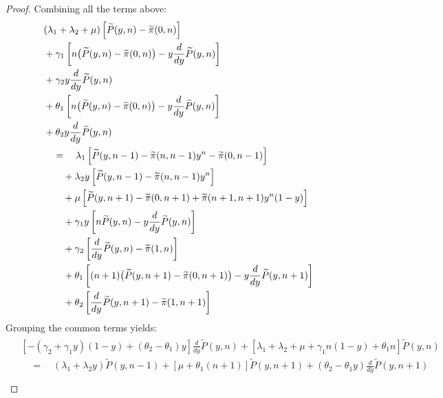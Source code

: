 \begin{proof}
    Combining all the terms above:
    \begin{align*}
        \begin{split}
            & (\lambda_1 + \lambda_2 + \mu) \left[ \widetilde{P}(y,n) - \widetilde{\pi}(0,n) \right] \\
            & + \gamma_1 \left[ n \big( \widetilde{P}(y,n) - \widetilde{\pi}(0,n) \big) - y \frac{d}{dy} \widetilde{P}(y,n) \right] \\
            & + \gamma_2 y \frac{d}{dy} \widetilde{P}(y,n) \\
            & + \theta_1 \left[ n \big( \widetilde{P}(y,n) - \widetilde{\pi}(0,n) \big) - y \frac{d}{dy} \widetilde{P}(y,n) \right] \\
            & + \theta_2 y \frac{d}{dy} \widetilde{P}(y,n) \\
            & \quad = \quad \lambda_1 \left[ \widetilde{P}(y,n-1) - \widetilde{\pi}(n,n-1) y^n - \widetilde{\pi}(0,n-1) \right] \\
            & \quad \quad + \lambda_2 y \left[ \widetilde{P}(y,n-1) - \widetilde{\pi}(n,n-1) y^n \right] \\
            & \quad \quad + \mu \left[ \widetilde{P}(y,n+1) - \widetilde{\pi}(0,n+1) + \widetilde{\pi}(n+1,n+1) y^n (1-y) \right] \\
            & \quad \quad + \gamma_1 y \left[ n \widetilde{P}(y,n) - y \frac{d}{dy} \widetilde{P}(y,n) \right] \\
            & \quad \quad + \gamma_2 \left[ \frac{d}{dy} \widetilde{P}(y,n) - \widetilde{\pi}(1,n) \right] \\
            & \quad \quad + \theta_1 \left[ (n+1) \big( \widetilde{P}(y,n+1) - \widetilde{\pi}(0,n+1) \big) - y \frac{d}{dy} \widetilde{P}(y,n+1) \right] \\
            & \quad \quad + \theta_2 \left[ \frac{d}{dy} \widetilde{P}(y,n+1) - \widetilde{\pi}(1,n+1) \right]
        \end{split}
    \end{align*}
    Grouping the common terms yields:
    \begin{align*}
        \begin{split}
            & \left[ -(\gamma_2 + \gamma_1 y)(1-y) + (\theta_2 - \theta_1) y \right] \frac{d}{dy} \widetilde{P}(y,n) + \left[ \lambda_1 + \lambda_2 + \mu + \gamma_1 n(1-y) + \theta_1 n \right] \widetilde{P}(y,n) \\
            & \quad = \quad (\lambda_1 + \lambda_2 y) \widetilde{P}(y,n-1) + \left[ \mu + \theta_1 (n+1) \right] \widetilde{P}(y,n+1) + (\theta_2 - \theta_1 y) \frac{d}{dy} \widetilde{P}(y,n+1) \\

\end{split}
\end{align*}
\end{proof}

